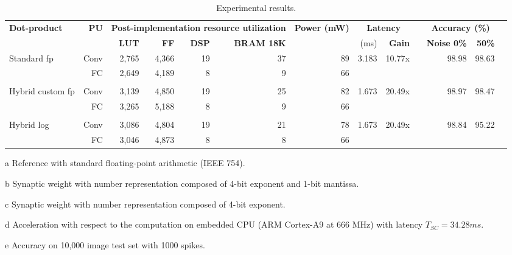\begin{table}[!t]
	\begin{threeparttable}
		\centering
		\caption{Experimental results.}\label{tab:results}
		\scriptsize
\begin{tabular}{lrrrrrrrrrrrr}\toprule
	\multirow{2}{*}{\textbf{Dot-product}} &\multirow{2}{*}{\textbf{PU}} &\multicolumn{4}{c}{\textbf{Post-implementation resource utilization}} &\multirow{2}{*}{\textbf{Power (mW)}} &\multicolumn{2}{c}{\textbf{Latency}} & &\multicolumn{2}{c}{\textbf{Accuracy (\%)\tnote{e}}} \\\cmidrule{3-6}\cmidrule{8-9}\cmidrule{11-12}
			& &\textbf{LUT} &\textbf{FF} &\textbf{DSP} &\textbf{BRAM 18K} & &(ms)&\textbf{Gain\tnote{d}} & &\textbf{Noise 0\%} &\textbf{50\%} \\\midrule
				\multirow{2}{*}{Standard \gls{fp}\tnote{a}} &Conv &2,765 &4,366 &19 &37 &89 &\multirow{2}{*}{3.183} &\multirow{2}{*}{10.77x} & &\multirow{2}{*}{98.98} &\multirow{2}{*}{98.63} \\
				&FC &2,649 &4,189 &8 &9 &66 & & & & & \\
				& & & & & & & & & & & \\
				\multirow{2}{*}{Hybrid custom \gls{fp}\tnote{b}} &Conv &3,139 &4,850 &19 &25 &82 &\multirow{2}{*}{1.673} &\multirow{2}{*}{20.49x} & &\multirow{2}{*}{98.97} &\multirow{2}{*}{98.47} \\
				&FC &3,265 &5,188 &8 &9 &66 & & & & & \\
				& & & & & & & & & & & \\
				\multirow{2}{*}{Hybrid log\tnote{c}} &Conv &3,086 &4,804 &19 &21 &78 &\multirow{2}{*}{1.673} &\multirow{2}{*}{20.49x} & &\multirow{2}{*}{98.84} &\multirow{2}{*}{95.22} \\
				&FC &3,046 &4,873 &8 &8 &66 & & & & & \\
				\bottomrule
			\end{tabular}
		\begin{tablenotes}
			\scriptsize
			\item[a] Reference with standard floating-point arithmetic (IEEE 754).
			\item[b] Synaptic weight with number representation composed of 4-bit exponent and 1-bit mantissa.
			\item[c] Synaptic weight with number representation composed of 4-bit exponent.
			\item[d] Acceleration with respect to the computation on embedded CPU (ARM Cortex-A9 at 666 MHz) with latency $T_{SC} = 34.28 ms$.
			\item[e] Accuracy on 10,000 image test set with 1000 spikes.
		\end{tablenotes}
	\end{threeparttable}
\end{table}


